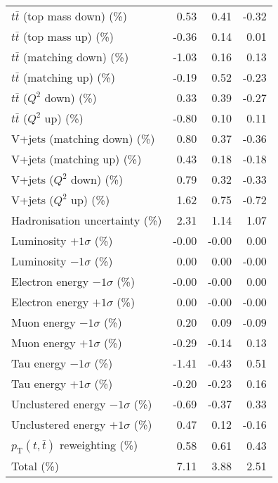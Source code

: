 \begin{table}[htbp]
{\begin{tabular}{lrrr}
$t\bar{t}$ (top mass down) (\%) & 0.53 & 0.41 & -0.32 \\ 
$t\bar{t}$ (top mass up) (\%) & -0.36 & 0.14 & 0.01 \\ 
$t\bar{t}$ (matching down) (\%) & -1.03 & 0.16 & 0.13 \\ 
$t\bar{t}$ (matching up) (\%) & -0.19 & 0.52 & -0.23 \\ 
$t\bar{t}$ ($Q^{2}$ down) (\%) & 0.33 & 0.39 & -0.27 \\ 
$t\bar{t}$ ($Q^{2}$ up) (\%) & -0.80 & 0.10 & 0.11 \\ 
V+jets (matching down) (\%) & 0.80 & 0.37 & -0.36 \\ 
V+jets (matching up) (\%) & 0.43 & 0.18 & -0.18 \\ 
V+jets ($Q^{2}$ down) (\%) & 0.79 & 0.32 & -0.33 \\ 
V+jets ($Q^{2}$ up) (\%) & 1.62 & 0.75 & -0.72 \\ 
Hadronisation uncertainty (\%) & 2.31 & 1.14 & 1.07 \\ 
Luminosity $+1\sigma$ (\%) & -0.00 & -0.00 & 0.00 \\ 
Luminosity $-1\sigma$ (\%) & 0.00 & 0.00 & -0.00 \\ 
Electron energy $-1\sigma$ (\%) & -0.00 & -0.00 & 0.00 \\ 
Electron energy $+1\sigma$ (\%) & 0.00 & -0.00 & -0.00 \\ 
Muon energy $-1\sigma$ (\%) & 0.20 & 0.09 & -0.09 \\ 
Muon energy $+1\sigma$ (\%) & -0.29 & -0.14 & 0.13 \\ 
Tau energy $-1\sigma$ (\%) & -1.41 & -0.43 & 0.51 \\ 
Tau energy $+1\sigma$ (\%) & -0.20 & -0.23 & 0.16 \\ 
Unclustered energy $-1\sigma$ (\%) & -0.69 & -0.37 & 0.33 \\ 
Unclustered energy $+1\sigma$ (\%) & 0.47 & 0.12 & -0.16 \\ 
$p_\mathrm{T}(t,\bar{t})$ reweighting (\%) & 0.58 & 0.61 & 0.43 \\ 
\hline 
Total (\%) & 7.11  & 3.88  & 2.51 \\ 
\hline 
\end{tabular}
}
\end{table}
